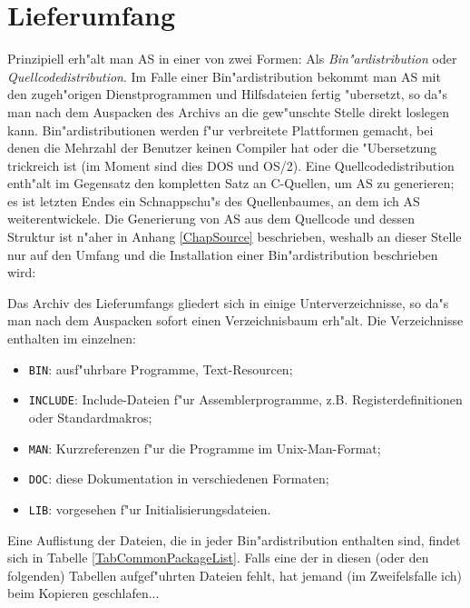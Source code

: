 \documentclass[12pt,a4paper,twoside]{report}
\newcommand{\asname}{AS}
\begin{document}

\section{Lieferumfang}

Prinzipiell erh"alt man \asname{} in einer von zwei Formen: Als {\em
Bin"ardistribution} oder {\em Quellcodedistribution}.  Im Falle einer
Bin"ardistribution bekommt man \asname{} mit den zugeh"origen Dienstprogrammen
und Hilfsdateien fertig "ubersetzt, so da"s man nach dem Auspacken des
Archivs an die gew"unschte Stelle direkt loslegen kann.
Bin"ardistributionen werden f"ur verbreitete Plattformen gemacht, bei
denen die Mehrzahl der Benutzer keinen Compiler hat oder die "Ubersetzung
trickreich ist (im Moment sind dies DOS und OS/2).  Eine
Quellcodedistribution enth"alt im Gegensatz den kompletten Satz an
C-Quellen, um \asname{} zu generieren; es ist letzten Endes ein Schnappschu"s
des Quellenbaumes, an dem ich \asname{} weiterentwickele.  Die Generierung von \asname{}
aus dem Quellcode und dessen Struktur ist n"aher in Anhang
\ref{ChapSource} beschrieben, weshalb an dieser Stelle nur auf den
Umfang und die Installation einer Bin"ardistribution beschrieben wird:

Das Archiv des Lieferumfangs gliedert sich in einige Unterverzeichnisse,
so da"s man nach dem Auspacken sofort einen Verzeichnisbaum erh"alt.  Die
Verzeichnisse enthalten im einzelnen:
\begin{itemize}
\item{{\tt BIN}: ausf"uhrbare Programme, Text-Resourcen;}
\item{{\tt INCLUDE}: Include-Dateien f"ur Assemblerprogramme, z.B.
      Registerdefinitionen oder Standardmakros;}
\item{{\tt MAN}: Kurzreferenzen f"ur die Programme im Unix-Man-Format;}
\item{{\tt DOC}: diese Dokumentation in verschiedenen Formaten;}
\item{{\tt LIB}: vorgesehen f"ur Initialisierungsdateien.}
\end{itemize}
Eine Auflistung der Dateien, die in jeder Bin"ardistribution enthalten
sind, findet sich in Tabelle \ref{TabCommonPackageList}.  Falls eine der
in diesen (oder den folgenden) Tabellen aufgef"uhrten Dateien fehlt, hat
jemand (im Zweifelsfalle ich) beim Kopieren geschlafen...
\end{document}
